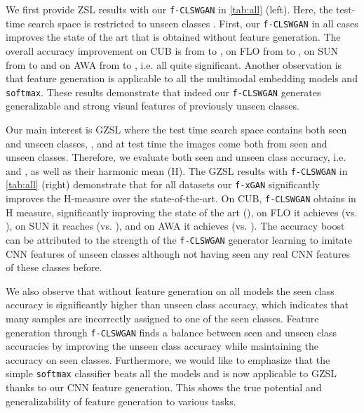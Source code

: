 \documentclass[10pt,twocolumn,letterpaper]{article}
\newcommand{\myparagraph}[1]{\vspace{6pt}\noindent{\bf #1}}
\def\mthd{\texttt{f-xGAN}\xspace}
\begin{document}
\myparagraph{ZSL with \texttt{f-CLSWGAN}.}
We first provide ZSL results with our \texttt{f-CLSWGAN} in \autoref{tab:all} (left).
Here, the test-time search space is restricted to unseen classes .
First, our \texttt{f-CLSWGAN} in all cases improves the state of the art that is obtained without feature generation.
The overall accuracy improvement on CUB is from  to , on FLO from  
to , on SUN from  to  and on AWA from  to , i.e. all quite significant. Another observation is that feature generation is applicable to all the multimodal embedding models and \texttt{softmax}. These results demonstrate that indeed our \texttt{f-CLSWGAN} generates generalizable and strong visual features of previously unseen classes. 

\myparagraph{GZSL with \texttt{f-CLSWGAN}.} Our main interest is GZSL where the test time search space contains both seen and unseen classes, , and at test time the images come both from seen and unseen classes. Therefore, we evaluate both seen and unseen class accuracy, i.e.  and , as well as their harmonic mean (H). The GZSL results with \texttt{f-CLSWGAN} in \autoref{tab:all} (right) demonstrate that for all datasets our \mthd significantly improves the H-measure over the state-of-the-art. On CUB, \texttt{f-CLSWGAN} obtains  in H measure, significantly improving the state of the art (), on FLO it achieves  (vs. ), on SUN it reaches  (vs. ),
and on AWA it achieves  (vs. ).
The accuracy boost can be attributed to the strength of the \texttt{f-CLSWGAN} generator learning to imitate CNN features of unseen classes although not having seen any real CNN features of these classes before. 

We also observe that without feature generation on all models the seen class accuracy is significantly higher than unseen class accuracy, which indicates that many samples are incorrectly assigned to one of the seen classes. Feature generation through \texttt{f-CLSWGAN} finds a balance between seen and unseen class accuracies by improving the unseen class accuracy while maintaining the accuracy on seen classes. Furthermore, we would like to emphasize that the simple \texttt{softmax} classifier beats all the models and is now applicable to GZSL thanks to our CNN feature generation. This shows the true potential and generalizability of feature generation to various tasks. 
\end{document}
